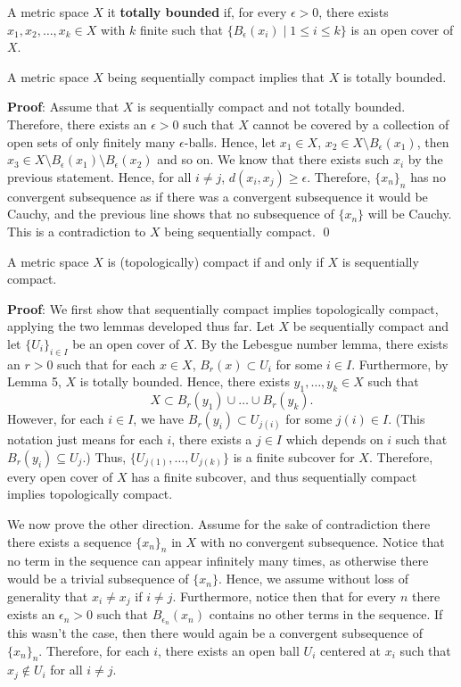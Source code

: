 \begin{definition}
A metric space $X$ it \textbf{totally bounded} if, for every $\epsilon>0$, there exists $x_1,x_2,\dots, x_k\in X$ with $k$ finite such that $\{B_\epsilon(x_i) \mid 1 \leq i \leq k\}$ is an open cover of $X$.
\end{definition}

\begin{lemma}
A metric space $X$ being sequentially compact implies that $X$ is totally bounded.
\end{lemma}
\textbf{Proof}: Assume that $X$ is sequentially compact and not totally bounded. Therefore, there exists an $\epsilon>0$ such that $X$ cannot be covered by a collection of open sets of only finitely many $\epsilon$-balls. Hence, let $x_1 \in X$, $x_2 \in X\setminus B_\epsilon(x_1)$, then $x_3 \in X\setminus B_\epsilon(x_1) \setminus B_\epsilon(x_2)$ and so on. We know that there exists such $x_i$ by the previous statement. Hence, for all $i\neq j$, $d(x_i, x_j) \geq \epsilon$. Therefore, $\{x_n\}_n$ has no convergent subsequence as if there was a convergent subsequence it would be Cauchy, and the previous line shows that no subsequence of $\{x_n\}$ will be Cauchy. This is a contradiction to $X$ being sequentially compact. \qed 

\begin{theorem}
A metric space $X$ is (topologically) compact if and only if $X$ is sequentially compact.
\end{theorem}

\textbf{Proof}:  We first show that sequentially compact implies topologically compact, applying the two lemmas developed thus far.  Let $X$ be sequentially compact and let $\{U_i\}_{i\in I}$ be an open cover of $X$. By the Lebesgue number lemma, there exists an $r>0$ such that for each $x\in X$, $B_r(x) \subset U_i$ for some $i\in I$. Furthermore, by Lemma 5, $X$ is totally bounded. Hence, there exists $y_1,\dots, y_k\in X$ such that 
\[
X\subset B_r(y_1) \cup \dots \cup B_r(y_k).
\]
However, for each $i\in I$, we have $B_r(y_i) \subset U_{j(i)}$ for some $j(i) \in I$. (This notation just means for each $i$, there exists a $j\in I$ which depends on $i$ such that $B_r(y_i) \subseteq U_{j}$.) Thus, $\{U_{j(1)},\dots, U_{j(k)}\}$ is a finite subcover for $X$. Therefore, every open cover of $X$ has a finite subcover, and thus sequentially compact implies topologically compact. 

We now prove the other direction. Assume for the sake of contradiction there there exists a sequence $\{x_n\}_n$ in $X$ with no convergent subsequence. Notice that no term in the sequence can appear infinitely many times, as otherwise there would be a trivial subsequence of $\{x_n\}$. Hence, we assume without loss of generality that $x_i \neq x_j$ if $i\neq j$. Furthermore, notice then that for every $n$ there exists an $\epsilon_n>0$ such that $B_{\epsilon_n}(x_n)$ contains no other terms in the sequence. If this wasn't the case, then there would again be a convergent subsequence of $\{x_n\}_n$. Therefore, for each $i$, there exists an open ball $U_i$ centered at $x_i$ such that $x_j \notin U_i$ for all $i\neq j$.

